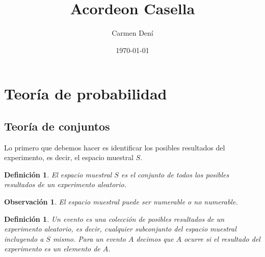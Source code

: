 \documentclass[14pt]{extarticle}
\title{Acordeon Casella}
\author{Carmen Dení}
\date{\today}
\newtheorem{definition}[theorem]{Definición}
\newtheorem{remark}{Observación}[section]
\begin{document}
\fontsize{18}{22}\selectfont

\section{Teoría de probabilidad}

\subsection{Teoría de conjuntos}
Lo primero que debemos hacer es identificar los posibles resultados del experimento, es decir,
el espacio muestral $S$.
\begin{definition}
    El espacio muestral $S$ es el conjunto de todos los posibles resultados de un experimento aleatorio.
\end{definition}
\begin{remark}
    El espacio muestral puede ser numerable o no numerable.
\end{remark}
\begin{definition}
    Un evento es una colección de posibles resultados de un experimento aleatorio, es decir,
     cualquier subconjunto del espacio muestral incluyendo a $S$ mismo.
     Para un evento $A$ decimos que $A$ ocurre si el resultado del experimento es un elemento de $A$.
\end{definition}
\end{document}
